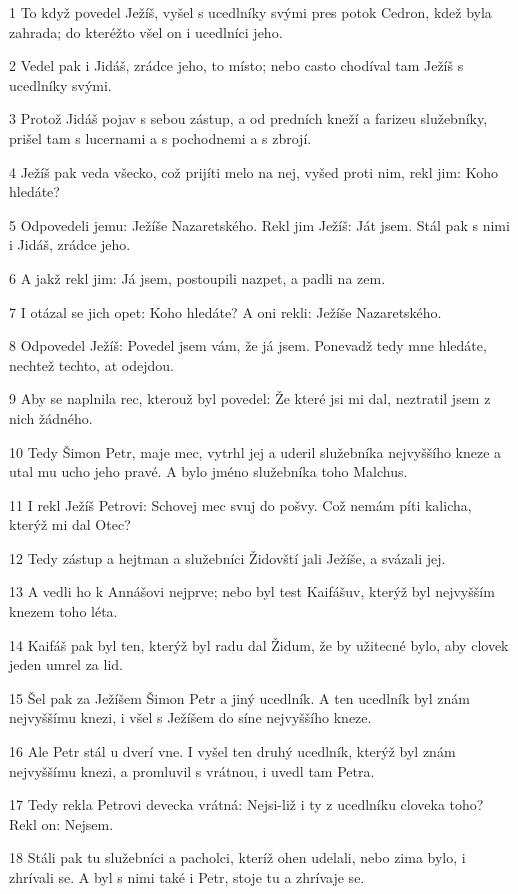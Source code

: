 \par 1 To když povedel Ježíš, vyšel s ucedlníky svými pres potok Cedron, kdež byla zahrada; do kteréžto všel on i ucedlníci jeho.
\par 2 Vedel pak i Jidáš, zrádce jeho, to místo; nebo casto chodíval tam Ježíš s ucedlníky svými.
\par 3 Protož Jidáš pojav s sebou zástup, a od predních kneží a farizeu služebníky, prišel tam s lucernami a s pochodnemi a s zbrojí.
\par 4 Ježíš pak veda všecko, což prijíti melo na nej, vyšed proti nim, rekl jim: Koho hledáte?
\par 5 Odpovedeli jemu: Ježíše Nazaretského. Rekl jim Ježíš: Ját jsem. Stál pak s nimi i Jidáš, zrádce jeho.
\par 6 A jakž rekl jim: Já jsem, postoupili nazpet, a padli na zem.
\par 7 I otázal se jich opet: Koho hledáte? A oni rekli: Ježíše Nazaretského.
\par 8 Odpovedel Ježíš: Povedel jsem vám, že já jsem. Ponevadž tedy mne hledáte, nechtež techto, at odejdou.
\par 9 Aby se naplnila rec, kterouž byl povedel: Že které jsi mi dal, neztratil jsem z nich žádného.
\par 10 Tedy Šimon Petr, maje mec, vytrhl jej a uderil služebníka nejvyššího kneze a utal mu ucho jeho pravé. A bylo jméno služebníka toho Malchus.
\par 11 I rekl Ježíš Petrovi: Schovej mec svuj do pošvy. Což nemám píti kalicha, kterýž mi dal Otec?
\par 12 Tedy zástup a hejtman a služebníci Židovští jali Ježíše, a svázali jej.
\par 13 A vedli ho k Annášovi nejprve; nebo byl test Kaifášuv, kterýž byl nejvyšším knezem toho léta.
\par 14 Kaifáš pak byl ten, kterýž byl radu dal Židum, že by užitecné bylo, aby clovek jeden umrel za lid.
\par 15 Šel pak za Ježíšem Šimon Petr a jiný ucedlník. A ten ucedlník byl znám nejvyššímu knezi, i všel s Ježíšem do síne nejvyššího kneze.
\par 16 Ale Petr stál u dverí vne. I vyšel ten druhý ucedlník, kterýž byl znám nejvyššímu knezi, a promluvil s vrátnou, i uvedl tam Petra.
\par 17 Tedy rekla Petrovi devecka vrátná: Nejsi-liž i ty z ucedlníku cloveka toho? Rekl on: Nejsem.
\par 18 Stáli pak tu služebníci a pacholci, kteríž ohen udelali, nebo zima bylo, i zhrívali se. A byl s nimi také i Petr, stoje tu a zhrívaje se.
